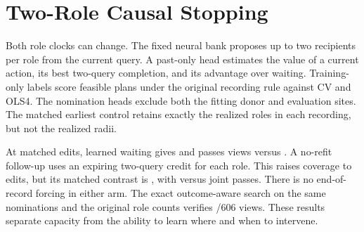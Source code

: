 \section{Two-Role Causal Stopping}

Both role clocks can change. The fixed neural bank proposes
up to two recipients per role from the current query. A
past-only head estimates the value of a current action, its
best two-query completion, and its advantage over waiting.
Training-only labels score feasible plans under the original
recording rule against CV and OLS4. The nomination heads
exclude both the fitting donor and evaluation sites. The
matched earliest control retains exactly the realized roles
in each recording, but not the realized radii.

At \DualClockWaitEdits{} matched edits, learned waiting gives
\DualClockWaitEffect{} and passes \DualClockWaitJoint{} views
versus \DualClockWaitMatchJoint{}. A no-refit follow-up uses
an expiring two-query credit for each role. This raises
coverage to \DualClockDeadlineEdits{} edits, but its matched
contrast is \DualClockDeadlineEffect{}, with
\DualClockDeadlineJoint{} versus \DualClockDeadlineMatchJoint{}
joint passes. There is no end-of-record forcing in either arm.
The exact outcome-aware search on the same nominations and
the original role counts verifies \DualClockCapacity{}/606
views. These results separate capacity from the ability to
learn where and when to intervene.

